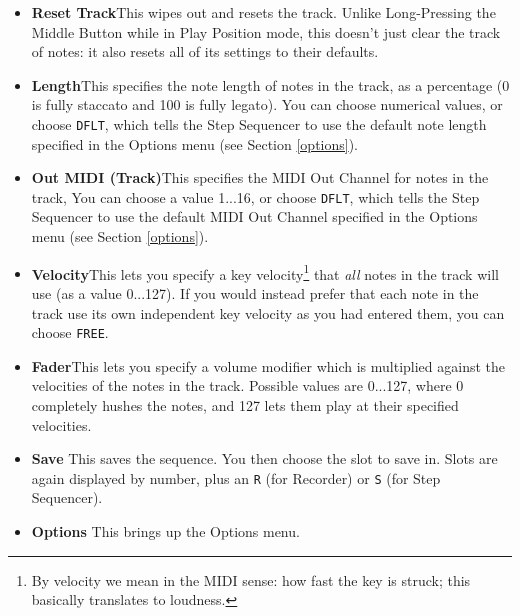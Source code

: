 \documentclass{article}
\begin{document}
\begin{itemize}
\item {\bf Reset Track}\quad This wipes out and resets the track.  Unlike Long-Pressing the Middle Button while in Play Position mode, this doesn't just clear the track of notes: it also resets all of its settings to their defaults.
\item {\bf Length}\quad This specifies the note length of notes in the track, as a percentage (0 is fully staccato and 100 is fully legato).   You can choose numerical values, or choose \texttt{DFLT}, which tells the Step Sequencer to use the default note length specified in the Options menu (see Section \ref{options}).
\item {\bf Out MIDI (Track)}\quad This specifies the MIDI Out Channel for notes in the track,    You can choose a value 1...16, or choose \texttt{DFLT}, which tells the Step Sequencer to use the default MIDI Out Channel specified in the Options menu (see Section \ref{options}).
\item {\bf Velocity}\quad This lets you specify a key velocity\footnote{By velocity we mean in the MIDI sense: how fast the key is struck; this basically translates to loudness.} that {\it all} notes in the track will use (as a value 0...127).  If you would instead prefer that each note in the track use its own independent key velocity as you had entered them, you can choose \texttt{FREE}.
\item {\bf Fader}\quad This lets you specify a volume modifier which is multiplied against the velocities of the notes in the track.  Possible values are 0...127, where 0 completely hushes the notes, and 127 lets them play at their specified velocities. 

\item {\bf Save} \quad This saves the sequence. You then choose the slot to save in.  Slots are again displayed by number, plus an \texttt{R} (for Recorder) or \texttt{S} (for Step Sequencer).
\item {\bf Options} \quad This brings up the Options menu.
\end{itemize}
\end{document}
